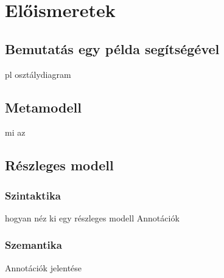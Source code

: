 \chapter{Előismeretek}

\section{Bemutatás egy példa segítségével}
pl osztálydiagram
\section{Metamodell}
mi az
\section{Részleges modell}
\subsection{Szintaktika}
hogyan néz ki egy részleges modell
Annotációk
\subsection{Szemantika}
Annotációk jelentése